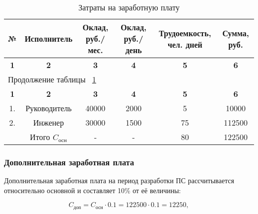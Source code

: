 \begin{center}
\begin{longtable}{|c|c|c|c|c|c|}
\caption{Затраты на заработную плату} \label{tab:eco_zarplata} \\ \hline
\multicolumn{1}{|c|}{\textbf{№}} & \multicolumn{1}{c|}{\textbf{Исполнитель}} & 
\multicolumn{1}{p{2.5cm}|}{\textbf{Оклад, руб./мес.}} &   \multicolumn{1}{p{2.5cm}|}{\textbf{Оклад, руб./день}} & 
\multicolumn{1}{p{3.5cm}|}{\textbf{Трудоемкость, чел. дней}} & \multicolumn{1}{p{2cm}|}{\textbf{Сумма, руб.}} \\ \hline

\multicolumn{1}{|c|}{\textbf{1}} &   \multicolumn{1}{c|}{\textbf{2}} & 
\multicolumn{1}{c|}{\textbf{3}} &   \multicolumn{1}{c|}{\textbf{4}} & 
\multicolumn{1}{c|}{\textbf{5}} & \multicolumn{1}{c|}{\textbf{6}} \\ \hline
\endfirsthead

\multicolumn{6}{|l|}{{Продолжение таблицы ~\ref{tab:eco_zarplata}}} \\ %
\hline
\multicolumn{1}{|c|}{\textbf{1}} &   \multicolumn{1}{c|}{\textbf{2}} & 
\multicolumn{1}{c|}{\textbf{3}} &   \multicolumn{1}{c|}{\textbf{4}} & 
\multicolumn{1}{c|}{\textbf{5}} & \multicolumn{1}{c|}{\textbf{6}} \\ \hline
\endhead

\endfoot

\hline
\endlastfoot

1. & Руководитель & 40000 & 2000 & 5 & 10000 \\ \hline
2. & Инженер & 30000 & 1500 & 75 & 112500 \\ \hline
 & Итого ${C_{\mbox{осн}}}$ & - & - & 80 & 122500 \\

\hline

\end{longtable}
\end{center}

\subsubsection*{Дополнительная заработная плата}
Дополнительная заработная плата на период разработки ПС рассчитывается относительно основной и составляет 10\% от её величины:

\begin{equation}
C_{\mbox{доп}} = C_{\mbox{осн}} \cdot 0.1 = 122500 \cdot 0.1 = 12250,
\end{equation}

